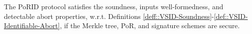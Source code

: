 \begin{theorem}
The PoRID protocol satisfies the soundness, inputs well-formedness, and detectable abort properties, w.r.t. Definitions \ref{deff::VSID-Soundness}-\ref{def::VSID-Identifiable-Abort}, if the Merkle tree, PoR, and signature schemes are secure.
\end{theorem}















